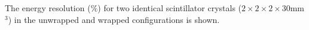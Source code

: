 \label{fig:energyresolution} The energy resolution ($\%$) for two identical scintillator crystals ($2\times2\times2\times30$mm$^3$) in the unwrapped and wrapped configurations is shown.
